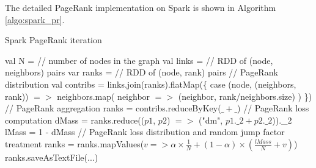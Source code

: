 \documentclass[12pt,conference,letterpaper]{IEEEtran}
\begin{document}

The detailed PageRank implementation on Spark is shown in Algorithm \ref{algo:spark_pr}.

\begin{algorithm}[!t]
\caption{Spark PageRank iteration}
\label{algo:spark_pr}
\begin{algorithmic}
\STATE val N = // number of nodes in the graph
\STATE val links =  // RDD of (node, neighbors) pairs
\STATE var ranks =  // RDD of (node, rank) pairs
\STATE // PageRank distribution
\STATE val contribs = links.join(ranks).flatMap(\{
  \STATE case (node, (neighbors, rank)) $=>$ 
  \STATE neighbors.map(
    \STATE neighbor $=>$ (neighbor, rank/neighbors.size)
    \STATE )
\STATE \})
\STATE // PageRank aggregation
\STATE ranks = contribs.reduceByKey($\_ + \_$)
\STATE // PageRank loss computation
\STATE dMass = ranks.reduce(($p1$, $p2$) $=>$ ("dm", $p1.\_2 + p2.\_2$)).\_2
\STATE lMass = 1 - dMass
\STATE // PageRank loss distribution and random jump factor treatment
\STATE ranks = ranks.mapValues($v => \alpha\times\frac{1}{N} + (1 - \alpha) \times (\frac{lMass}{N} + v)$)
\ENDFOR 
\STATE ranks.saveAsTextFile(...)
\end{algorithmic}
\end{algorithm}





\end{document}
